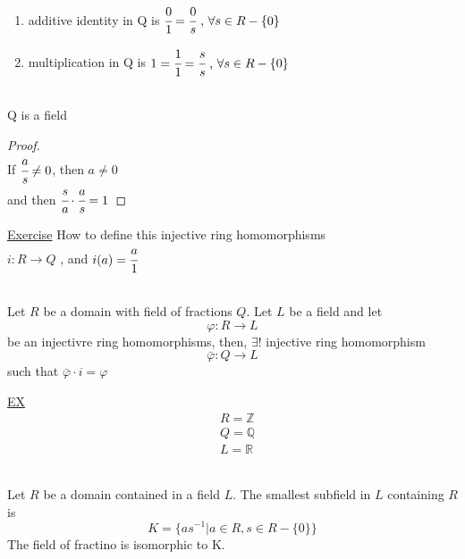 \documentclass{article}
\begin{document}
\begin{enumerate}
    \item additive identity in Q is $\cfrac{0}{1} = \cfrac{0}{s} \text{ , } \forall s \in R - \{0\}$ 
    \item multiplication in Q is $1 = \cfrac{1}{1} = \cfrac{s}{s}  \text{ , } \forall s \in R - \{0\}$
\end{enumerate}

\begin{lemma} \leavevmode \\ 
    Q is a field
\end{lemma}
\begin{proof} \leavevmode \\
    If $\cfrac{a}{s} \not = 0$, then $a \not= 0$ \\ 
    and then $\cfrac{s}{a} \cdot \cfrac{a}{s} = 1$
\end{proof}



\underline{Exercise}
How to define this injective ring homomorphisms \\ 
$i: R \to Q$ , and $i(a) = \cfrac{a}{1}$ 

\begin{proposition}[3.4.1]\leavevmode \\ 
    Let $R$ be a domain with field of fractions $Q$. Let $L$ be a field and let $$\varphi: R \to L$$ be an injectivre ring homomorphisms, 
    then, $\exists!$ injective ring homomorphism $$\bar{\varphi}: Q \to L $$ such that $\bar{\varphi} \cdot i = \varphi$ 

   
\end{proposition}

    \underline{EX} 
    \begin{align*}
        &R = \mathbb{Z} \\ 
        &Q = \mathbb{Q} \\ 
        &L = \mathbb{R} 
    \end{align*}


    \begin{proposition} \leavevmode \\ 
        Let $R$ be a domain contained in a field $L$. The smallest subfield in $L$ containing $R$ is \\ 
        $$K = \{as^{-1} | a \in R, s \in R - \{0\}\} $$
        The field of fractino is isomorphic to K. 
    \end{proposition}
\end{document}
